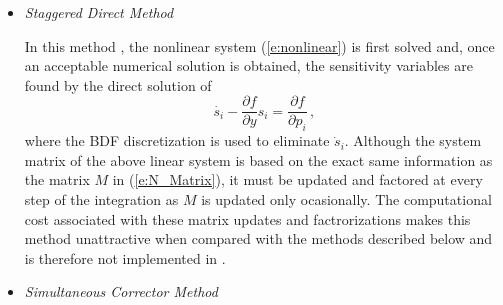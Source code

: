 \begin{itemize}

\item {\em Staggered Direct Method}
  
  In this method \cite{CS85}, the nonlinear system (\ref{e:nonlinear}) is first solved and, 
  once an acceptable numerical solution is obtained, the sensitivity variables 
  are found by the direct solution of 
  \begin{equation}\label{e:sensi_syst}
    \dot{s_i}  - \frac{\partial f}{\partial y} s_i = \frac{\partial f}{\partial p_i} \, ,
  \end{equation}
  where the BDF discretization is used to eliminate ${\dot s}_i$. Although the 
  system matrix of the above linear system is based on the exact same information
  as the matrix $M$ in (\ref{e:N_Matrix}), it must be updated and factored at every
  step of the integration as $M$ is updated only ocasionally. The computational cost 
  associated with these matrix updates and factrorizations makes this method 
  unattractive when compared with the methods described below and is therefore not
  implemented in {\cvodes}.
  
\item {\em Simultaneous Corrector Method}


\end{itemize}
